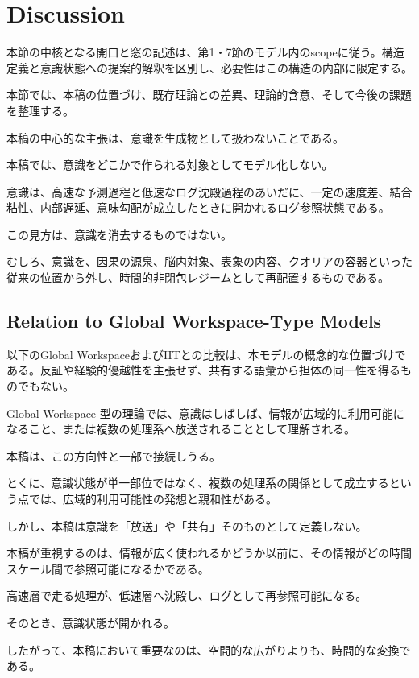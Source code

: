 \section{Discussion}

本節の中核となる開口と窓の記述は、第1・7節のモデル内のscopeに従う。構造定義と意識状態への提案的解釈を区別し、必要性はこの構造の内部に限定する。


本節では、本稿の位置づけ、既存理論との差異、理論的含意、そして今後の課題を整理する。

本稿の中心的な主張は、意識を生成物として扱わないことである。

本稿では、意識をどこかで作られる対象としてモデル化しない。

意識は、高速な予測過程と低速なログ沈殿過程のあいだに、一定の速度差、結合粘性、内部遅延、意味勾配が成立したときに開かれるログ参照状態である。

この見方は、意識を消去するものではない。

むしろ、意識を、因果の源泉、脳内対象、表象の内容、クオリアの容器といった従来の位置から外し、時間的非閉包レジームとして再配置するものである。

\subsection{Relation to Global Workspace-Type Models}

以下のGlobal WorkspaceおよびIITとの比較は、本モデルの概念的な位置づけである。反証や経験的優越性を主張せず、共有する語彙から担体の同一性を得るものでもない。

Global Workspace 型の理論では、意識はしばしば、情報が広域的に利用可能になること、または複数の処理系へ放送されることとして理解される。

本稿は、この方向性と一部で接続しうる。

とくに、意識状態が単一部位ではなく、複数の処理系の関係として成立するという点では、広域的利用可能性の発想と親和性がある。

しかし、本稿は意識を「放送」や「共有」そのものとして定義しない。

本稿が重視するのは、情報が広く使われるかどうか以前に、その情報がどの時間スケール間で参照可能になるかである。

高速層で走る処理が、低速層へ沈殿し、ログとして再参照可能になる。

そのとき、意識状態が開かれる。

したがって、本稿において重要なのは、空間的な広がりよりも、時間的な変換である。

